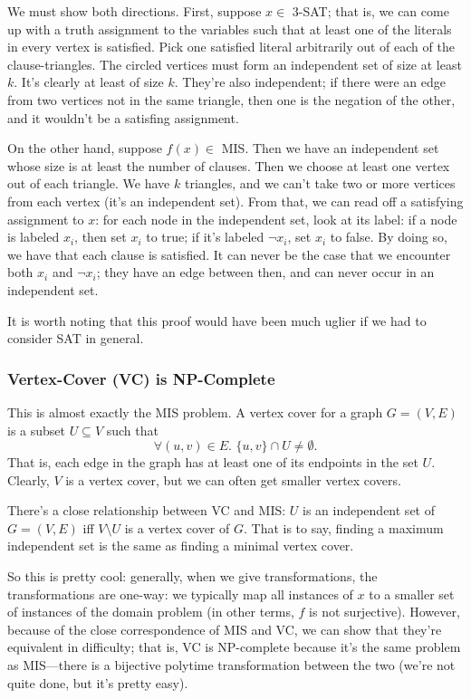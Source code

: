 \documentclass{article}
\begin{document}
We must show both directions.
First, suppose $x\in $ 3-SAT; that is, we can come up with a truth assignment
to the variables such that at least one of the literals in every vertex
is satisfied. Pick one satisfied literal  arbitrarily out of each of the
clause-triangles. The circled vertices must form an independent set of size
at least $k$. It's clearly at least of size $k$. They're also independent; if
there were an edge from two vertices not in the same triangle, then one
is the negation of the other, and it wouldn't be a satisfing assignment.

On the other hand, suppose $f(x)\in$ MIS. Then we have an independent set
whose size is at least the number of clauses. Then we choose at least one
vertex out of each triangle. We have $k$ triangles, and we can't take
two or more vertices from each vertex (it's an independent set).
From that, we can read off a satisfying assignment to $x$: for each node in
the independent set, look at its label: if a node is labeled $x_i$, then 
set $x_i$ to true; if it's labeled $\neg x_i$, set $x_i$ to false. By
doing so, we have that each clause is satisfied. It can never be the
case that we encounter both $x_i$ and $\neg x_i$; they have an edge between
then, and can never occur in an independent set.

It is worth noting that this proof would have been much uglier if we had
to consider SAT in general.



\subsubsection{Vertex-Cover (VC) is NP-Complete}

This is almost exactly the MIS problem. A vertex cover for a graph $G=(V,E)$
is a subset $U\subseteq V$ such that
$$
\forall(u,v)\in E.\,\,
\{u,v\} \cap U \neq \emptyset.
$$
That is, each edge in the graph has at least one of its endpoints in the set
$U$.
Clearly, $V$ is a vertex cover, but we can often get smaller vertex covers.

There's a close relationship between VC and MIS: $U$ is an independent set
of $G=(V,E)$ iff $V\setminus U$ is a vertex cover of $G$.
That is to say, finding a maximum independent set is the same as finding
a minimal vertex cover.

So this is pretty cool: generally, when we give transformations, the 
transformations are one-way: we typically map all instances of $x$ to a smaller
set of instances of the domain problem (in other terms, $f$ is not surjective).
However, because of the close correspondence of MIS and VC, we can show that
they're equivalent in difficulty; that is, VC is NP-complete because it's the
same problem as MIS---there is a bijective polytime transformation between the 
two (we're not quite done, but it's pretty easy).
\end{document}
